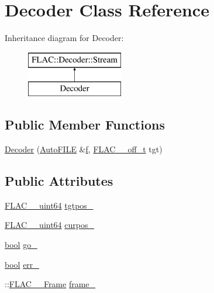 \hypertarget{class_decoder}{}\section{Decoder Class Reference}
\label{class_decoder}
Inheritance diagram for Decoder\+:\begin{figure}[H]
\begin{center}
\leavevmode
\includegraphics[height=2.000000cm]{class_decoder}
\end{center}
\end{figure}
\subsection*{Public Member Functions}
\begin{DoxyCompactItemize}
\item 
\hyperlink{class_decoder_a707a7989e925691f36dfeba2b73b5311}{Decoder} (\hyperlink{class_auto_f_i_l_e}{Auto\+F\+I\+LE} \&\hyperlink{checksum_8c_ae747d72a1a803f5ff4a4b2602857d93b}{f}, \hyperlink{libflac_2include_2share_2compat_8h_a125fb0105eee035da35c6a4999d140eb}{F\+L\+A\+C\+\_\+\+\_\+off\+\_\+t} tgt)
\end{DoxyCompactItemize}
\subsection*{Public Attributes}
\begin{DoxyCompactItemize}
\item 
\hyperlink{ordinals_8h_aa78c8c70a3eb8a58af7436f278acde8e}{F\+L\+A\+C\+\_\+\+\_\+uint64} \hyperlink{class_decoder_ae38b1d7af7b7d4183e08f6d6261e613c}{tgtpos\+\_\+}
\item 
\hyperlink{ordinals_8h_aa78c8c70a3eb8a58af7436f278acde8e}{F\+L\+A\+C\+\_\+\+\_\+uint64} \hyperlink{class_decoder_a4075565f84fd5d60dc4dd806f8d70049}{curpos\+\_\+}
\item 
\hyperlink{mac_2config_2i386_2lib-src_2libsoxr_2soxr-config_8h_abb452686968e48b67397da5f97445f5b}{bool} \hyperlink{class_decoder_ade7cfa226613d187dd8dee95266038e5}{go\+\_\+}
\item 
\hyperlink{mac_2config_2i386_2lib-src_2libsoxr_2soxr-config_8h_abb452686968e48b67397da5f97445f5b}{bool} \hyperlink{class_decoder_acc4aa5d5e582ec5ed9a3ad3316017925}{err\+\_\+}
\item 
\+::\hyperlink{struct_f_l_a_c_____frame}{F\+L\+A\+C\+\_\+\+\_\+\+Frame} \hyperlink{class_decoder_a67321d1abcae24336f64d6d620d12cad}{frame\+\_\+}
\end{DoxyCompactItemize}
